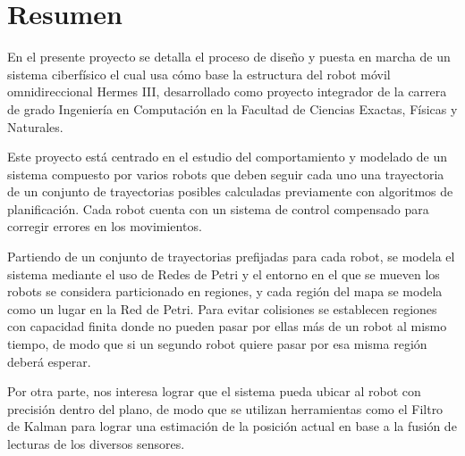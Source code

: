 
\newpage
\chapter*{Resumen}

En el presente proyecto se detalla el proceso de diseño y puesta en marcha de un sistema ciberfísico el cual usa cómo base la estructura del robot móvil omnidireccional Hermes III, desarrollado como proyecto integrador de la carrera de grado Ingeniería en Computación en la Facultad de Ciencias Exactas, Físicas y Naturales.

Este proyecto está centrado en el estudio del comportamiento y modelado de un sistema compuesto por varios robots que deben seguir cada uno una trayectoria de un conjunto de trayectorias posibles calculadas previamente con algoritmos de planificación. Cada robot cuenta con un sistema de control compensado para corregir errores en los movimientos.

Partiendo de un conjunto de trayectorias prefijadas para cada robot, se modela el sistema mediante el uso de Redes de Petri y el entorno en el que se mueven los robots se considera particionado en regiones, y cada región del mapa se modela como un lugar en la Red de Petri. Para evitar colisiones se establecen regiones con capacidad finita donde no pueden pasar por ellas más de un robot al mismo tiempo, de modo que si un segundo robot quiere pasar por esa misma región deberá esperar.

Por otra parte, nos interesa lograr que el sistema pueda ubicar al robot con precisión dentro del plano, de modo que se utilizan herramientas como el Filtro de Kalman para lograr una estimación de la posición actual en base a la fusión de lecturas de los diversos sensores.